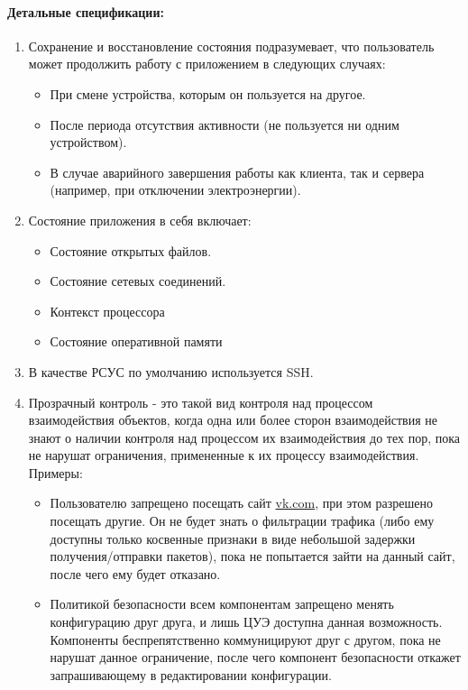 \paragraph*{Детальные спецификации:}
\begin{enumerate}[label={\bfseriesДС-\arabic*.}]
   \item Сохранение и восстановление состояния подразумевает, что пользователь может продолжить работу с приложением в следующих случаях:
         \begin{itemize}
            \item При смене устройства, которым он пользуется на другое.
            \item После периода отсутствия активности (не пользуется ни одним устройством).
            \item В случае аварийного завершения работы как клиента, так и сервера (например, при отключении электроэнергии).
         \end{itemize}
         \label{DS-appstate_switch}
   \item Состояние приложения в себя включает:
         \begin{itemize}
            \item Состояние открытых файлов.
            \item Состояние сетевых соединений.
            \item Контекст процессора
            \item Состояние оперативной памяти
         \end{itemize}
         \label{DS-appstate-description}
   \item В качестве РСУС по умолчанию используется SSH. \label{DS-remote_access_default}
   \item Прозрачный контроль - это такой вид контроля над процессом взаимодействия объектов, когда одна или более сторон взаимодействия не знают о наличии контроля над процессом их взаимодействия до тех пор, пока не нарушат ограничения, примененные к их процессу взаимодействия. Примеры: \label{DS-transparent-control}
   \begin{itemize}
      \item Пользователю запрещено посещать сайт \url{vk.com}, при этом разрешено посещать другие. Он не будет знать о фильтрации трафика (либо ему доступны только косвенные признаки в виде небольшой задержки получения/отправки пакетов), пока не попытается зайти на данный сайт, после чего ему будет отказано.
      \item Политикой безопасности всем компонентам запрещено менять конфигурацию друг друга, и лишь ЦУЭ доступна данная возможность. Компоненты беспрепятственно коммуницируют друг с другом, пока не нарушат данное ограничение, после чего компонент безопасности откажет запрашивающему в редактировании конфигурации.
   \end{itemize}
\end{enumerate}


